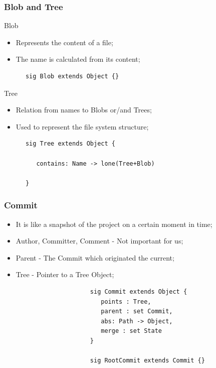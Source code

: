 \documentclass{beamer}
\begin{document}
\begin{frame}[fragile]
   \frametitle{Blob and Tree}
   \begin{block}{Blob}
      \begin{itemize}
         \item Represents the content of a file;
         \item The name is calculated from its content;
      \end{itemize}
      \tiny
      \color{blue}
      \begin{lstlisting}
      sig Blob extends Object {}
      \end{lstlisting}
   \end{block}
   \begin{block}{Tree}
      \begin{itemize}
         \item Relation from names to Blobs or/and Trees;
         \item Used to represent the file system structure;
      \end{itemize}
      \tiny
      \color{blue}
      \begin{lstlisting}
      sig Tree extends Object {
         
         contains: Name -> lone(Tree+Blob)
      
      }
      \end{lstlisting}
   \end{block}
\end{frame}


\begin{frame}[fragile]
   \frametitle{Commit}
   \begin{itemize}
      \item It is like a snapshot of the project on a certain moment
      in time;
      \item Author, Committer, Comment - Not important for us;
      \item Parent - The Commit which originated the current;
      \item Tree - Pointer to a Tree Object;
   \end{itemize}
   \tiny
   \color{blue}
   \begin{lstlisting}
                        sig Commit extends Object {
                           points : Tree,
                           parent : set Commit,
                           abs: Path -> Object,
                           merge : set State
                        }
                           
                        sig RootCommit extends Commit {}
\end{lstlisting}
\end{frame}
\end{document}
